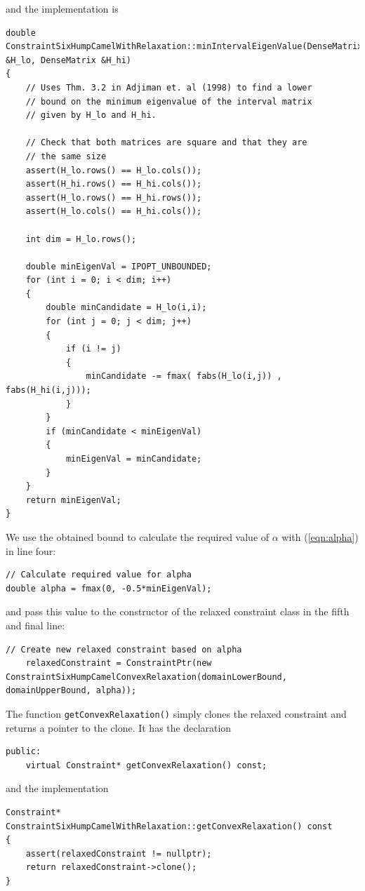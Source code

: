and the implementation is
\begin{lstlisting}
double ConstraintSixHumpCamelWithRelaxation::minIntervalEigenValue(DenseMatrix &H_lo, DenseMatrix &H_hi)
{
    // Uses Thm. 3.2 in Adjiman et. al (1998) to find a lower
    // bound on the minimum eigenvalue of the interval matrix
    // given by H_lo and H_hi.

    // Check that both matrices are square and that they are
    // the same size
    assert(H_lo.rows() == H_lo.cols());
    assert(H_hi.rows() == H_hi.cols());
    assert(H_lo.rows() == H_hi.rows());
    assert(H_lo.cols() == H_hi.cols());

    int dim = H_lo.rows();

    double minEigenVal = IPOPT_UNBOUNDED;
    for (int i = 0; i < dim; i++)
    {
        double minCandidate = H_lo(i,i);
        for (int j = 0; j < dim; j++)
        {
            if (i != j)
            {
                minCandidate -= fmax( fabs(H_lo(i,j)) , fabs(H_hi(i,j)));
            }
        }
        if (minCandidate < minEigenVal)
        {
            minEigenVal = minCandidate;
        }
    }
    return minEigenVal;
}
\end{lstlisting}
We use the obtained bound to calculate the required value of $\alpha$ with (\ref{eqn:alpha}) in line four:
\begin{lstlisting}
// Calculate required value for alpha
double alpha = fmax(0, -0.5*minEigenVal);
\end{lstlisting}
and pass this value to the constructor of the relaxed constraint class in the fifth and final line:
\begin{lstlisting}
// Create new relaxed constraint based on alpha
	relaxedConstraint = ConstraintPtr(new ConstraintSixHumpCamelConvexRelaxation(domainLowerBound, domainUpperBound, alpha));
\end{lstlisting}
The function \texttt{getConvexRelaxation()} simply clones the relaxed constraint and returns a pointer to the clone. It has the declaration
\begin{lstlisting}
public:
	virtual Constraint* getConvexRelaxation() const;
\end{lstlisting}
and the implementation
\begin{lstlisting}
Constraint* ConstraintSixHumpCamelWithRelaxation::getConvexRelaxation() const
{
	assert(relaxedConstraint != nullptr);
	return relaxedConstraint->clone();
}
\end{lstlisting}

